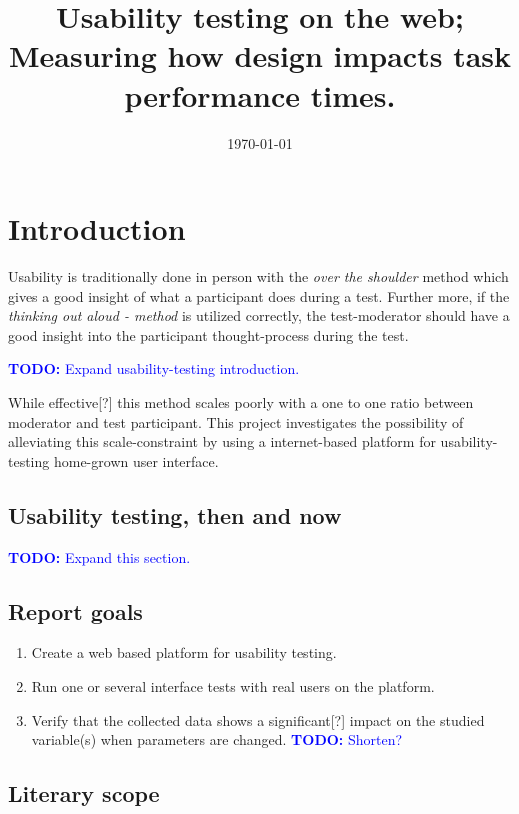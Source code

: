 \documentclass[nofilelist]{cslthse-msc}
\title{
  Usability testing on the web; Measuring how design impacts task performance
  times.
}
\date{\today}
\begin{document}
\renewcommand{\bibname}{References}

\makefrontmatter
\newcommand{\todo}[1]{\textcolor{blue}{\textbf{TODO:} #1}}
\newcommand{\eatdot}[1]{}
\newcommand{\ctitle}[1]{\citetitle{#1}\cite{#1}}
\newcommand{\vv}[1]{\unskip}

\chapter{Introduction}

	Usability is traditionally done in person with the
	\textit{over the shoulder} method which gives a good insight of what a
	participant does during a test. Further more, if the
	\textit{thinking out aloud - method} is utilized correctly, the
	test-moderator should have a good insight into the participant
	thought-process during the test.

	\todo{Expand usability-testing introduction.}

	While effective[?] this method scales poorly with a one to one ratio between
	moderator and test participant. This project investigates the possibility of
	alleviating this scale-constraint by using a internet-based platform for
	usability-testing home-grown user interface.

	\section{Usability testing, then and now}

		\todo{Expand this section.}

	\section{Report goals}

		\begin{enumerate}
			\item{Create a web based platform for usability testing.}
			\item{Run one or several interface tests with real users on the platform.}
			\item{
				Verify that the collected data shows a significant[?] impact on the studied
				variable(s) when parameters are changed. \todo{Shorten?}
			}
		\end{enumerate}

	\section{Literary scope}
\end{document}
